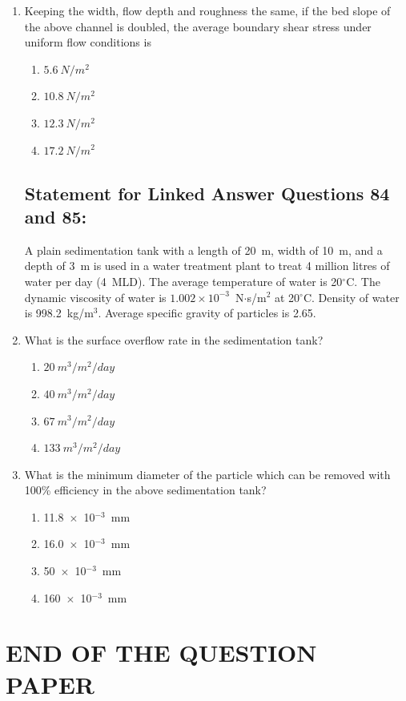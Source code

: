 \documentclass[journal,12pt,onecolumn]{IEEEtran}
\theoremstyle{remark}
\begin{document}
\begin{enumerate}
\item Keeping the width, flow depth and roughness the same, if the bed slope of the above channel is doubled, the average boundary shear stress under uniform flow conditions is

\hfill{}
\begin{enumerate}
\item $5.6~N/m^2$
\item $10.8~N/m^2$
\item $12.3~N/m^2$
\item $17.2~N/m^2$
\end{enumerate}

\subsection*{Statement for Linked Answer Questions 84 and 85:}
A plain sedimentation tank with a length of 20~m, width of 10~m, and a depth of 3~m is used in a water treatment plant to treat 4 million litres of water per day (4~MLD). The average temperature of water is 20$^\circ$C. The dynamic viscosity of water is $1.002 \times 10^{-3}$~N$\cdot$s/m$^2$ at 20$^\circ$C. Density of water is 998.2~kg/m$^3$. Average specific gravity of particles is 2.65.

\item What is the surface overflow rate in the sedimentation tank?

\hfill{}
\begin{enumerate}
\item $20~m^3/m^2/day$
\item $40~m^3/m^2/day$
\item $67~m^3/m^2/day$
\item $133~m^3/m^2/day$
\end{enumerate}

\item What is the minimum diameter of the particle which can be removed with 100\% efficiency in the above sedimentation tank?

\hfill{}
\begin{enumerate}
\item 11.8~$\times$~10$^{-3}$~mm
\item 16.0~$\times$~10$^{-3}$~mm
\item 50~$\times$~10$^{-3}$~mm
\item 160~$\times$~10$^{-3}$~mm
\end{enumerate}
\end{enumerate}

\section*{END OF THE QUESTION PAPER}
\end{document}
